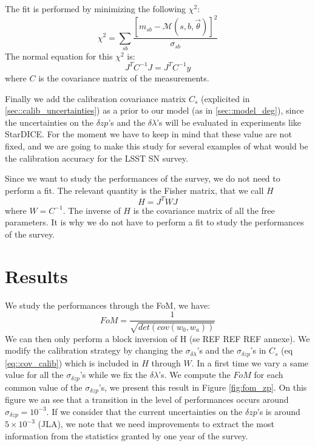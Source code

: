 \documentclass[\docopts]{\docclass}
\begin{document}
The fit is performed by minimizing the following $\chi^2$:
\begin{equation}
\chi^2 = \sum_{sb}\frac{[m_{sb} - \mathcal{M}(s, b, \vec\theta)]^2}{\sigma_{sb}}
\end{equation}
The normal equation for this $\chi^2$ is:
\begin{equation}
J^TC^{-1}J = J^TC^{-1}y
\end{equation}
where $C$ is the covariance matrix of the measurements.

Finally we add the calibration covariance matrix $C_s$ (explicited in \ref{sec::calib_uncertainties}) as a prior to our model (as in \ref{sec::model_deg}), since the uncertainties on the $\delta zp$'s and the $\delta \lambda$'s will be evaluated in experiments like StarDICE. For the moment we have to keep in mind that these value are not fixed, and we are going to make this study for several examples of what would be the calibration accuracy for the LSST SN survey.

Since we want to study the performances of the survey, we do not need to perform a fit.
The relevant quantity is the Fisher matrix, that we call $H$
\begin{equation}
H = J^TWJ
\end{equation}
where $W = C^{-1}$.
The inverse of $H$ is the covariance matrix of all the free parameters. It is why we do not have to perform a fit to study the performances of the survey.


\section{Results}
\label{sec::results}
We study the performances through the FoM, we have:
\begin{equation}
FoM = \frac{1}{\sqrt{det(cov(w_0, w_a))}}
\end{equation}
We can then only perform a block inversion of H (se REF REF REF annexe).
We modify the calibration strategy by changing the $\sigma_{\delta \lambda}$'s and the $\sigma_{\delta zp}$'s in $C_s$ (eq \ref{eq::cov_calib}) which is included in $H$ through $W$.
In a first time we vary a same value for all the $\sigma_{\delta zp}$'s while we fix the $\delta \lambda$'s.
We compute the $FoM$ for each common value of the $\sigma_{\delta zp}$'s, we present this result in Figure \ref{fig:fom_zp}.
On this figure we an see that a transition in the level of performances occurs around $\sigma_{\delta zp} = 10^{-3}$.
If we consider that the current uncertainties on the $\delta zp$'s is around $5 \times 10^{-3}$ (JLA), we note that we need improvements to extract the most information from the statistics granted by one year of the survey.
\end{document}
